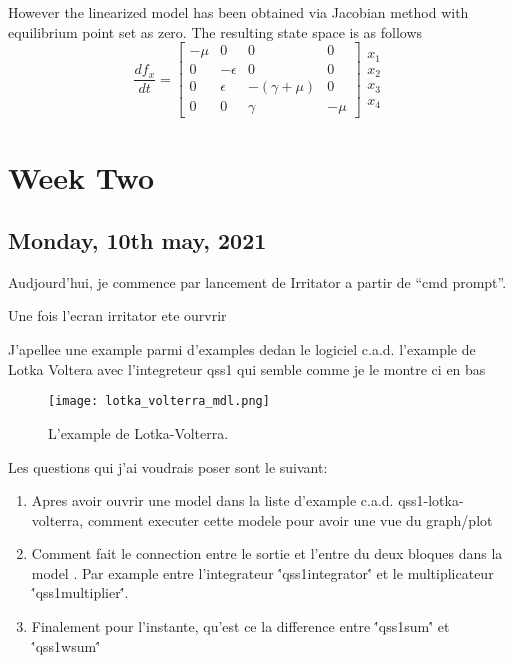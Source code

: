 \documentclass[a4paper, 12pt, notitlepage]{report}
\begin{document}
However the linearized model has been obtained via Jacobian method with equilibrium point set as zero. The resulting state space is as follows
\begin{equation}
\frac{df_x}{dt}=
\begin{bmatrix}
-\mu & 0 & 0 & 0 \\
0 & -\epsilon & 0 & 0 \\
0 & \epsilon & -(\gamma + \mu) & 0 \\
0 & 0 & \gamma & - \mu 
\end{bmatrix}
\begin{matrix}
x_1 \\
x_2\\
x_3\\
x_4
\end{matrix}
\end{equation}

\section{Week Two}
\subsection{Monday, 10th may, 2021}
Audjourd'hui, je commence par lancement de Irritator a partir de ``cmd prompt''.

Une fois l'ecran irritator ete ourvrir

J'apellee une example parmi d'examples dedan le logiciel c.a.d. l'example de Lotka Voltera avec l'integreteur qss1 qui semble comme je le montre ci en bas

\begin{figure}[htbp]
\centerline{\texttt{[image: lotka\_volterra\_mdl.png]}}
\caption{L'example de Lotka-Volterra.}
\label{fig}
\end{figure}

Les questions qui j'ai voudrais poser sont le suivant:\\

\begin{enumerate}
\item
Apres avoir ouvrir une model dans la liste d'example c.a.d. qss1-lotka-volterra, comment executer cette modele pour avoir une vue du graph/plot
\item
Comment fait le connection entre le sortie et l'entre du deux bloques dans la model . Par example entre l'integrateur \''qss1integrator\'' et le multiplicateur \''qss1multiplier\''.
\item
Finalement pour l'instante, qu'est ce la difference entre \''qss1sum\'' et \''qss1wsum\''
\end{enumerate}
\end{document}
